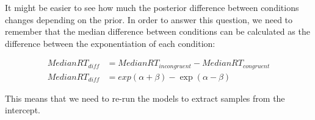 \documentclass[12pt,]{krantz}
\theoremstyle{definition}
\theoremstyle{definition}
\theoremstyle{definition}
\theoremstyle{remark}
\begin{document}
It might be easier to see how much the posterior difference between conditions changes depending on the prior. In order to answer this question, we need to remember that the median difference between conditions can be calculated as the difference between the exponentiation of each condition:

\begin{equation}
\begin{aligned}
MedianRT_{diff} &= MedianRT_{incongruent} - MedianRT_{congruent}\\
MedianRT_{diff} &= exp(\alpha + \beta) - \exp(\alpha - \beta)
\end{aligned}
\label{eq:medianrt}
\end{equation}

This means that we need to re-run the models to extract samples from the intercept.
\end{document}
